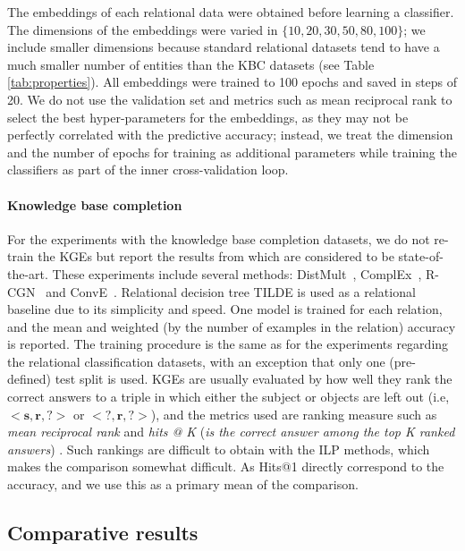 The embeddings of each relational data were obtained before learning a classifier.
The dimensions of the embeddings were varied in $\{10, 20, 30, 50, 80, 100\}$; we include smaller dimensions because standard relational datasets tend to have a much smaller number of entities than the KBC datasets (see Table \ref{tab:properties}).
All embeddings were trained to 100 epochs and saved in steps of 20.
We do not use the validation set and metrics such as mean reciprocal rank to select the best hyper-parameters for the embeddings, as they may not be perfectly correlated with the predictive accuracy; instead, we treat the dimension and the number of epochs for training as additional parameters while training the classifiers as part of the inner cross-validation loop.


\paragraph{Knowledge base completion}
For the experiments with the knowledge base completion datasets, we do not re-train the KGEs but report the results from \cite{dettmers2018conve} which are considered to be state-of-the-art.
These experiments include several methods: DistMult~\cite{YangYHGD14a}, ComplEx~\cite{trouillon2016complex}, R-CGN~\cite{Schlichtkrull2017ModelingRD} and ConvE~\cite{dettmers2018conve}.
Relational decision tree TILDE is used as a relational baseline due to its simplicity and speed.
One model is trained for each relation, and the mean and weighted (by the number of examples in the relation) accuracy is reported.
The training procedure is the same as for the experiments regarding the relational classification datasets, with an exception that only one (pre-defined) test split is used.
KGEs are usually evaluated by how well they rank the correct answers to a triple in which either the subject or objects are left out (i.e, $<\mathbf{s},\mathbf{r},\mathbf{?}>$ or $<\mathbf{?},\mathbf{r},\mathbf{?}>$), and the metrics used are ranking measure such as \textit{mean reciprocal rank} and \textit{hits @ K} (\textit{is the correct answer among the top K ranked answers}) \cite{Bordes:2013:TEM}.
Such rankings are difficult to obtain with the ILP methods, which makes the comparison somewhat difficult.
As Hits@1 directly correspond to the accuracy, and we use this as a primary mean of the comparison.







\subsection{Comparative results}

